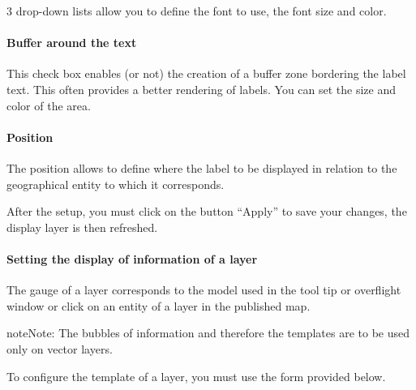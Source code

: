 \documentclass[letterpaper,10pt,english]{sphinxmanual}
\begin{document}
3 drop-down lists allow you to define the font to use, the font size and color.
\paragraph{Buffer around the text}

This check box enables (or not) the creation of a buffer zone bordering the label text. This often provides a better rendering of labels. You can set the size and color of the area.
\paragraph{Position}

The position allows to define where the label to be displayed in relation to the geographical entity to which it corresponds.

After the setup, you must click on the button ``Apply'' to save your changes, the display layer is then refreshed.


\paragraph{Setting the display of information of a layer}
\label{maps/layerstree:parametrage-de-l-affichage-des-informations-d-une-couche}
The gauge of a layer corresponds to the model used in the tool tip or overflight window or click on an entity of a layer in the published map.

\begin{notice}{note}{Note:}
The bubbles of information and therefore the templates are to be used only on vector layers.
\end{notice}

To configure the template of a layer, you must use the form provided below.
\end{document}
